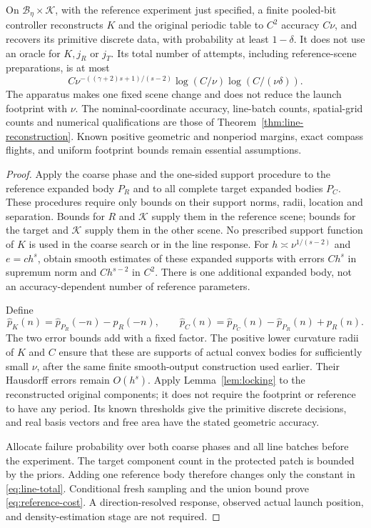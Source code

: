 \begin{theorem}
\label{thm:reference-finite}
On $\mathcal B_\eta\times\mathcal K$, with the reference experiment
just specified, a finite pooled-bit controller reconstructs $K$ and
the original periodic table to $C^2$ accuracy $C\nu$, and recovers
its primitive discrete data, with probability at least $1-\delta$.
It does not use an oracle for $K,j_R$ or $j_T$. Its total number of
attempts, including reference-scene preparations, is at most
\begin{equation}\label{eq:reference-cost}
 C\nu^{-((\gamma+2)s+1)/(s-2)}
                   \log(C/\nu)\log(C/(\nu\delta)).
\end{equation}
The apparatus makes one fixed scene change and does not reduce the
launch footprint with $\nu$. The nominal-coordinate accuracy,
line-batch counts, spatial-grid counts and numerical qualifications
are those of Theorem~\ref{thm:line-reconstruction}. Known positive
geometric and nonperiod margins, exact compass flights, and uniform
footprint bounds remain essential assumptions.
\end{theorem}
\begin{proof}
Apply the coarse phase and the one-sided support procedure to the
reference expanded body $P_R$ and to all complete target expanded
bodies $P_C$. These procedures require only bounds on their support
norms, radii, location and separation. Bounds for $R$ and $\mathcal K$
supply them in the reference scene; bounds for the target and
$\mathcal K$ supply them in the other scene. No prescribed support
function of $K$ is used in the coarse search or in the line response.
For $h\asymp\nu^{1/(s-2)}$ and $e=c h^s$, obtain smooth estimates
of these expanded supports with errors $C h^s$ in supremum norm and
$C h^{s-2}$ in $C^2$. There is one additional expanded body, not an
accuracy-dependent number of reference parameters.

Define
\[
 \widehat p_K(n)=\widehat p_{P_R}(-n)-p_R(-n),\qquad
 \widehat p_C(n)=\widehat p_{P_C}(n)-\widehat p_{P_R}(n)+p_R(n).
\]
The two error bounds add with a fixed factor. The positive lower
curvature radii of $K$ and $C$ ensure that these are supports of actual
convex bodies for sufficiently small $\nu$, after the same finite
smooth-output construction used earlier. Their Hausdorff errors remain
$O(h^s)$. Apply Lemma~\ref{lem:locking} to the reconstructed original
components; it does not require the footprint or reference to have any
period. Its known thresholds give the primitive discrete decisions,
and real basis vectors and free area have the stated geometric accuracy.

Allocate failure probability over both coarse phases and all line
batches before the experiment. The target component count in the
protected patch is bounded by the priors. Adding one reference body
therefore changes only the constant in \eqref{eq:line-total}.
Conditional fresh sampling and the union bound prove
\eqref{eq:reference-cost}. A direction-resolved response, observed
actual launch position, and density-estimation stage are not required.
\end{proof}

